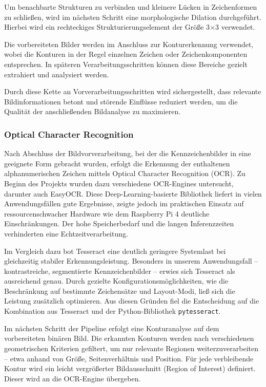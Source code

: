 Um benachbarte Strukturen zu verbinden und kleinere Lücken in Zeichenformen zu schließen, wird im nächsten Schritt eine morphologische Dilation durchgeführt. Hierbei wird ein rechteckiges Strukturierungselement der Größe 3$\times$3 verwendet.\singlespacing

Die vorbereiteten Bilder werden im Anschluss zur Konturerkennung verwendet, wobei die Konturen in der Regel einzelnen Zeichen oder Zeichenkomponenten entsprechen. In späteren Verarbeitungsschritten können diese Bereiche gezielt extrahiert und analysiert werden.\singlespacing

Durch diese Kette an Vorverarbeitungsschritten wird sichergestellt, dass relevante Bildinformationen betont und störende Einflüsse reduziert werden, um die Qualität der anschließenden Bildanalyse zu maximieren.


\subsubsection{Optical Character Recognition\cite{geeksforgeeks2021tesseract}}

Nach Abschluss der Bildvorverarbeitung, bei der die Kennzeichenbilder in eine geeignete Form gebracht wurden, erfolgt die Erkennung der enthaltenen alphanumerischen Zeichen mittels Optical Character Recognition (OCR). Zu Beginn des Projekts wurden dazu verschiedene OCR-Engines untersucht, darunter auch EasyOCR. Diese Deep-Learning-basierte Bibliothek liefert in vielen Anwendungsfällen gute Ergebnisse, zeigte jedoch im praktischen Einsatz auf ressourcenschwacher Hardware wie dem Raspberry Pi 4 deutliche Einschränkungen. Der hohe Speicherbedarf und die langen Inferenzzeiten verhinderten eine Echtzeitverarbeitung.\singlespacing

Im Vergleich dazu bot Tesseract eine deutlich geringere Systemlast bei gleichzeitig stabiler Erkennungsleistung. Besonders in unserem Anwendungsfall – kontrastreiche, segmentierte Kennzeichenbilder – erwies sich Tesseract als ausreichend genau. Durch gezielte Konfigurationsmöglichkeiten, wie die Beschränkung auf bestimmte Zeichensätze und Layout-Modi, ließ sich die Leistung zusätzlich optimieren. Aus diesen Gründen fiel die Entscheidung auf die Kombination aus Tesseract und der Python-Bibliothek \texttt{pytesseract}.\singlespacing

Im nächsten Schritt der Pipeline erfolgt eine Konturanalyse auf dem vorbereiteten binären Bild. Die erkannten Konturen werden nach verschiedenen geometrischen Kriterien gefiltert, um nur relevante Regionen weiterzuverarbeiten – etwa anhand von Größe, Seitenverhältnis und Position. Für jede verbleibende Kontur wird ein leicht vergrößerter Bildausschnitt (Region of Interest) definiert. Dieser wird an die OCR-Engine übergeben.\singlespacing


